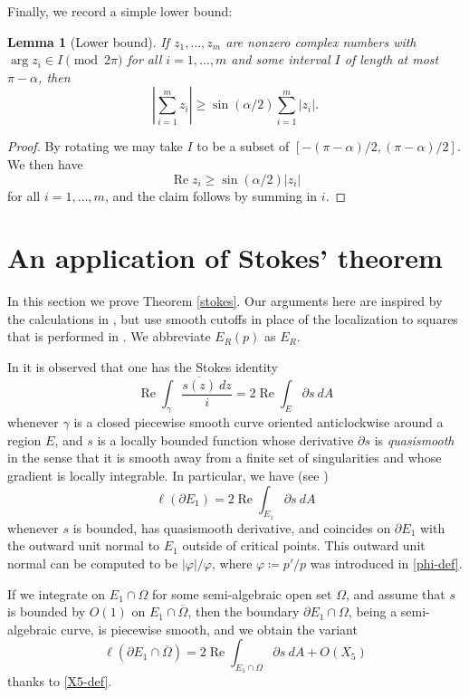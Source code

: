 \documentclass[12pt]{amsart}
\newtheorem{lemma}{Lemma}[section]
\renewcommand{\arg}{\operatorname{arg}}
\renewcommand{\Re}{\operatorname{Re}}
\begin{document}
Finally, we record a simple lower bound:

\begin{lemma}[Lower bound]\label{lower-triangle}  If $z_1,\dots,z_m$ are nonzero complex numbers with $\arg z_i \in I \pmod{2\pi}$ for all $i=1,\dots,m$ and some interval $I$ of length at most $\pi - \alpha$, then
$$ \left| \sum_{i=1}^m z_i \right| \geq \sin(\alpha/2) \sum_{i=1}^m |z_i|.$$
\end{lemma}

\begin{proof} By rotating we may take $I$ to be a subset of $[-(\pi-\alpha)/2, (\pi-\alpha)/2]$.  We then have
    $$ \Re z_i \geq \sin(\alpha/2) |z_i|$$
for all $i=1,\dots,m$, and the claim follows by summing in $i$.
\end{proof}


\section{An application of Stokes' theorem}\label{stokes-sec}

In this section we prove Theorem \ref{stokes}. Our arguments here are inspired by the calculations in \cite[\S 4,9]{fryntov}, but use smooth cutoffs in place of the localization to squares that is performed in \cite[\S 9]{fryntov}.  We abbreviate $E_R(p)$ as $E_R$.

In \cite[\S 4]{fryntov} it is observed that one has the Stokes identity
$$ \Re \int_\gamma \frac{\overline{s(z)}\ dz}{i} = 2 \Re \int_E \partial s\ dA$$
whenever $\gamma$ is a closed piecewise smooth curve oriented anticlockwise around a region $E$, and $s$ is a locally bounded function whose derivative $\partial s$ is \emph{quasismooth} in the sense that it is smooth away from a finite set of singularities and whose gradient is locally integrable.  In particular, we have (see \cite[(4)]{fryntov})
\begin{equation}\label{stokes-ident}
     \ell(\partial E_1) = 2 \Re \int_{E_1} \partial s\ dA
\end{equation}
whenever $s$ is bounded, has quasismooth derivative, and coincides on $\partial E_1$ with the outward unit normal to $E_1$ outside of critical points.  This outward unit normal can be computed to be $|\varphi|/\varphi$, where $\varphi \coloneqq p'/p$ was introduced in \eqref{phi-def}.

If we integrate on $E_1 \cap \Omega$ for some semi-algebraic open set $\Omega$, and assume that $s$ is bounded by $O(1)$ on $E_1 \cap \overline{\Omega}$, then the boundary $\partial E_1 \cap \Omega$, being a semi-algebraic curve, is piecewise smooth, and we obtain the variant
\begin{equation}\label{stokes-ident-2}
     \ell(\partial E_1 \cap \overline{\Omega}) = 2 \Re \int_{E_1 \cap \Omega} \partial s\ dA + O(X_5)
\end{equation}
thanks to \eqref{X5-def}.
\end{document}
